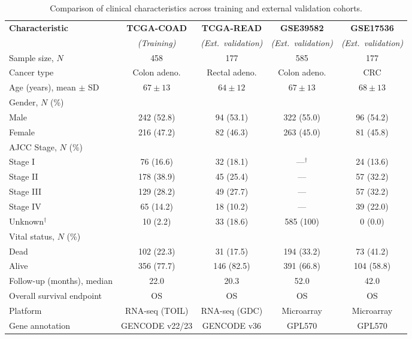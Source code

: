 \begin{table}[htp]
\setlength\tabcolsep{4pt}
\centering
\caption{Comparison of clinical characteristics across training and external validation cohorts.}
\label{TabS_clinical}
\begin{tabular}{@{}lcccc@{}}
\toprule[2pt]
\textbf{Characteristic} & \textbf{TCGA-COAD} & \textbf{TCGA-READ} & \textbf{GSE39582} & \textbf{GSE17536} \\
& \textit{(Training)} & \textit{(Ext.\ validation)} & \textit{(Ext.\ validation)} & \textit{(Ext.\ validation)} \\
\midrule[1pt]
Sample size, $N$ & 458 & 177 & 585 & 177 \\
Cancer type & Colon adeno. & Rectal adeno. & Colon adeno. & CRC \\
Age (years), mean $\pm$ SD & $67 \pm 13$ & $64 \pm 12$ & $67 \pm 13$ & $68 \pm 13$ \\[3pt]
Gender, $N$ (\%) & & & & \\
\quad Male & 242 (52.8) & 94 (53.1) & 322 (55.0) & 96 (54.2) \\
\quad Female & 216 (47.2) & 82 (46.3) & 263 (45.0) & 81 (45.8) \\[3pt]
AJCC Stage, $N$ (\%) & & & & \\
\quad Stage I & 76 (16.6) & 32 (18.1) & —$^{\dagger}$ & 24 (13.6) \\
\quad Stage II & 178 (38.9) & 45 (25.4) & — & 57 (32.2) \\
\quad Stage III & 129 (28.2) & 49 (27.7) & — & 57 (32.2) \\
\quad Stage IV & 65 (14.2) & 18 (10.2) & — & 39 (22.0) \\
\quad Unknown$^{\dagger}$ & 10 (2.2) & 33 (18.6) & 585 (100) & 0 (0.0) \\[3pt]
Vital status, $N$ (\%) & & & & \\
\quad Dead & 102 (22.3) & 31 (17.5) & 194 (33.2) & 73 (41.2) \\
\quad Alive & 356 (77.7) & 146 (82.5) & 391 (66.8) & 104 (58.8) \\[3pt]
Follow-up (months), median & 22.0 & 20.3 & 52.0 & 42.0 \\
Overall survival endpoint & OS & OS & OS & OS \\
\midrule[1pt]
Platform & RNA-seq (TOIL) & RNA-seq (GDC) & Microarray & Microarray \\
Gene annotation & GENCODE v22/23 & GENCODE v36 & GPL570 & GPL570 \\

\end{tabular}
\end{table}
